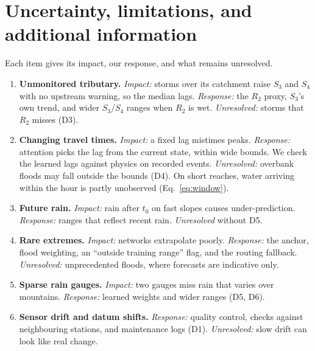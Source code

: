 \documentclass[11pt,a4paper]{article}
\begin{document}
\section{Uncertainty, limitations, and additional information}\label{sec:unc}
Each item gives its impact, our response, and what remains unresolved.
\begin{enumerate}[label=\textbf{U\arabic*}, ref=U\arabic*, leftmargin=*]
  \item \textbf{Unmonitored tributary.} \emph{Impact:} storms over its
  catchment raise $S_3$ and $S_4$ with no upstream warning, so the median
  lags. \emph{Response:} the $R_2$ proxy, $S_3$'s own trend, and wider
  $S_3$/$S_4$ ranges when $R_2$ is wet. \emph{Unresolved:} storms that $R_2$
  misses (D3).

  \item \textbf{Changing travel times.} \emph{Impact:} a fixed lag mistimes
  peaks. \emph{Response:} attention picks the lag from the current state,
  within wide bounds. We check the learned lags against physics on recorded
  events. \emph{Unresolved:} overbank floods may fall outside the bounds
  (D4). On short reaches, water arriving within the hour is partly
  unobserved (Eq.~\ref{eq:window}).

  \item \textbf{Future rain.} \emph{Impact:} rain after $t_0$ on fast slopes
  causes under-prediction. \emph{Response:} ranges that reflect recent rain.
  \emph{Unresolved} without D5.

  \item \textbf{Rare extremes.} \emph{Impact:} networks extrapolate poorly.
  \emph{Response:} the anchor, flood weighting, an ``outside training range''
  flag, and the routing fallback. \emph{Unresolved:} unprecedented floods,
  where forecasts are indicative only.

  \item \textbf{Sparse rain gauges.} \emph{Impact:} two gauges miss rain that
  varies over mountains. \emph{Response:} learned weights and wider ranges
  (D5, D6).

  \item \textbf{Sensor drift and datum shifts.} \emph{Response:} quality
  control, checks against neighbouring stations, and maintenance logs (D1).
  \emph{Unresolved:} slow drift can look like real change.


\end{enumerate}
\end{document}
